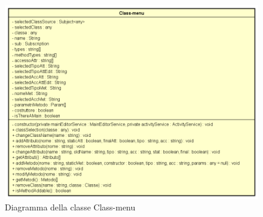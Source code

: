 \begin{figure}[h!]
	\centering
	\includegraphics[scale=0.6]{res/sections/SpecificaFrontEnd/Services/Disegnetti/class-menu.png}
	\caption{Diagramma della classe Class-menu}
\end{figure}

